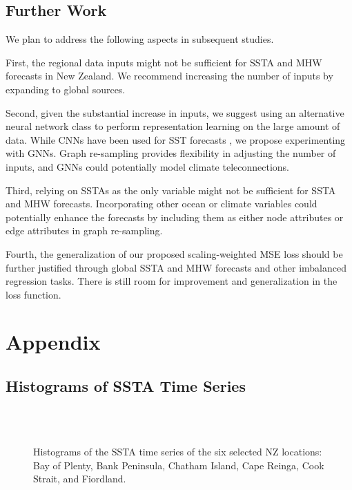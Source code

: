 \documentclass[11pt, a4paper]{article}
\begin{document}
\subsection{Further Work}

We plan to address the following aspects in subsequent studies.

First, the regional data inputs might not be sufficient for SSTA and MHW forecasts in New Zealand. We recommend increasing the number of inputs by expanding to global sources.

Second, given the substantial increase in inputs, we suggest using an alternative neural network class to perform representation learning on the large amount of data. While CNNs have been used for SST forecasts \citep{taylor2022deep}, we propose experimenting with GNNs. Graph re-sampling provides flexibility in adjusting the number of inputs, and GNNs could potentially model climate teleconnections.

Third, relying on SSTAs as the only variable might not be sufficient for SSTA and MHW forecasts. Incorporating other ocean or climate variables could potentially enhance the forecasts by including them as either node attributes or edge attributes in graph re-sampling.

Fourth, the generalization of our proposed scaling-weighted MSE loss should be further justified through global SSTA and MHW forecasts and other imbalanced regression tasks. There is still room for improvement and generalization in the loss function.




\appendix

\section{Appendix}

\subsection{Histograms of SSTA Time Series}\label{apd:hist}

\begin{figure}[H]
\centering
{}
\\
\\
\caption{Histograms of the SSTA time series of the six selected NZ locations: Bay of Plenty, Bank Peninsula, Chatham Island, Cape Reinga, Cook Strait, and Fiordland.}
\end{figure}
\end{document}
